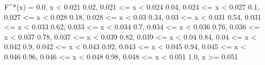 F^*(x) = 
    0.0, x < 0.021
    0.02,  0.021 <= x < 0.024 
    0.04,  0.024 <= x < 0.027 
    0.1,  0.027 <= x < 0.028 
    0.18,  0.028 <= x < 0.03 
    0.34,  0.03 <= x < 0.031 
    0.54,  0.031 <= x < 0.033 
    0.62,  0.033 <= x < 0.034 
    0.7,  0.034 <= x < 0.036 
    0.76,  0.036 <= x < 0.037 
    0.78,  0.037 <= x < 0.039 
    0.82,  0.039 <= x < 0.04 
    0.84,  0.04 <= x < 0.042 
    0.9,  0.042 <= x < 0.043 
    0.92,  0.043 <= x < 0.045 
    0.94,  0.045 <= x < 0.046 
    0.96,  0.046 <= x < 0.048 
    0.98,  0.048 <= x < 0.051 
    1.0, x >= 0.051 
